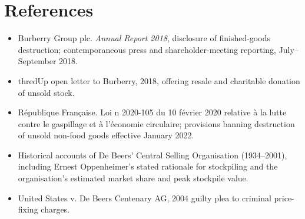 \documentclass[11pt]{article}
\begin{document}
\section*{References}
\begin{itemize}[nosep]
\item Burberry Group plc. \emph{Annual Report 2018}, disclosure of finished-goods destruction; contemporaneous press and shareholder-meeting reporting, July--September 2018.
\item thredUp open letter to Burberry, 2018, offering resale and charitable donation of unsold stock.
\item R\'epublique Fran\c{c}aise. Loi n\textdegree{} 2020-105 du 10 f\'evrier 2020 relative \`a la lutte contre le gaspillage et \`a l'\'economie circulaire; provisions banning destruction of unsold non-food goods effective January 2022.
\item Historical accounts of De Beers' Central Selling Organisation (1934--2001), including Ernest Oppenheimer's stated rationale for stockpiling and the organisation's estimated market share and peak stockpile value.
\item United States v. De Beers Centenary AG, 2004 guilty plea to criminal price-fixing charges.
\end{itemize}
\end{document}
